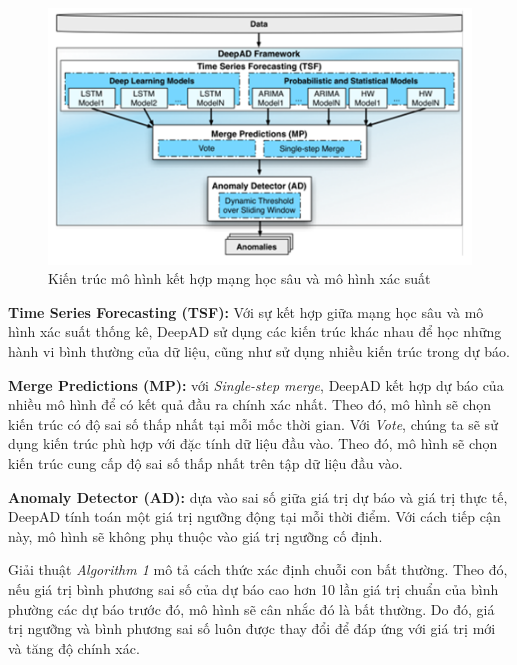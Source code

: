 \begin{figure}[H]
    \centering
    \includegraphics[scale=0.95]{./content/images/3-9.png}
    \caption{Kiến trúc mô hình kết hợp mạng học sâu và mô hình xác suất \cite{st15}}
    \label{fig:3-9}
\end{figure}

\textbf{Time Series Forecasting (TSF):} Với sự kết hợp giữa mạng học sâu và mô hình xác suất thống kê, DeepAD sử dụng các kiến trúc khác nhau để học những hành vi bình thường của dữ liệu, cũng như sử dụng nhiều kiến trúc trong dự báo.

\textbf{Merge Predictions (MP):} với \textit{Single-step merge}, DeepAD kết hợp dự báo của nhiều mô hình để có kết quả đầu ra chính xác nhất. Theo đó, mô hình sẽ chọn kiến trúc có độ sai số thấp nhất tại mỗi mốc thời gian. Với \textit{Vote}, chúng ta sẽ sử dụng kiến trúc phù hợp với đặc tính dữ liệu đầu vào. Theo đó, mô hình sẽ chọn kiến trúc cung cấp độ sai số thấp nhất trên tập dữ liệu đầu vào.

\textbf{Anomaly Detector (AD):} dựa vào sai số giữa giá trị dự báo và giá trị thực tế, DeepAD tính toán một giá trị ngưỡng động tại mỗi thời điểm. Với cách tiếp cận này, mô hình sẽ không phụ thuộc vào giá trị ngưỡng cố định.

Giải thuật \textit{Algorithm 1} mô tả cách thức xác định chuỗi con bất thường. Theo đó, nếu giá trị bình phương sai số của dự báo cao hơn 10 lần giá trị chuẩn của bình phường các dự báo trước đó, mô hình sẽ cân nhắc đó là bất thường. Do đó, giá trị ngưỡng và bình phương sai số luôn được thay đổi để đáp ứng với giá trị mới và tăng độ chính xác.

